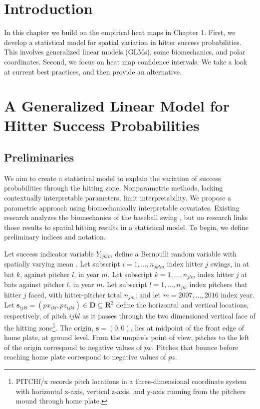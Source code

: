 \section{Introduction}
In this chapter we build on the empirical heat maps in Chapter 1. First, we develop a statistical model for spatial variation in hitter success probabilities. This involves generalized linear models (GLMs), some biomechanics, and polar coordinates. Second, we focus on heat map confidence intervals. We take a look at current best practices, and then provide an alternative.

\section{A Generalized Linear Model for Hitter Success Probabilities} %

\subsection{Preliminaries}

We aim to create a statistical model to explain the variation of success probabilities through the hitting zone. Nonparametric methods, lacking contextually interpretable parameters, limit interpretability. We propose a parametric approach using biomechanically interpretable covariates. Existing research analyzes the biomechanics of the baseball swing \citep{Welch1995}, but no research links those results to spatial hitting results in a statistical model. To begin, we define preliminary indices and notation.

Let success indicator variable $Y_{ijklm}$ define a Bernoulli random variable with spatially varying mean \citep{Ross2002}. Let subscript $i = 1, \dots, n_{jklm}$ index hitter $j$ swings, in at bat $k$, against pitcher $l$, in year $m$. Let subscript $k = 1, \dots, n_{jlm}$ index hitter $j$ at bats against pitcher $l$, in year $m$. Let subscript $l = 1, \dots, n_{jm}$ index pitchers that hitter $j$ faced, with hitter-pitcher total $n_{jm}$; and let $m = 2007, \dots, 2016$ index year. Let $\pmb{s}_{ijkl} = (px_{ikl}, pz_{ijkl})\in \pmb{D} \subseteq \pmb{R}^{2}$ define the horizontal and vertical locations, respectively, of pitch $ijkl$ as it passes through the two dimensioned vertical face of the hitting zone\footnote{PITCHf/x\textsuperscript{\textregistered} records pitch locations in a three-dimensional coordinate system with horizontal x-axis, vertical z-axis, and y-axis running from the pitchers mound through home plate.}. The origin, $\pmb{s} = (0,0)$, lies at midpoint of the front edge of home plate, at ground level. From the umpire's point of view, pitches to the left of the origin correspond to negative values of $px$. Pitches that bounce before reaching home plate correspond to negative values of $pz$.  

